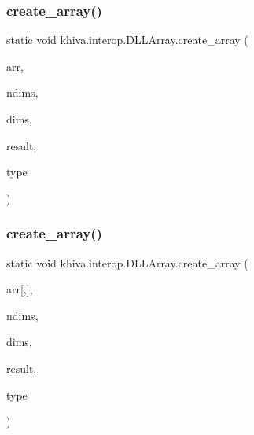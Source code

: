 \mbox{\label{classkhiva_1_1interop_1_1_d_l_l_array_ac6e0b2907774bf20bae24c7b6306786c}} 
\subsubsection{\texorpdfstring{create\+\_\+array()}{create\_array()}\hspace{0.1cm}{\footnotesize\ttfamily [5/36]}}
{\footnotesize\ttfamily static void khiva.\+interop.\+D\+L\+L\+Array.\+create\+\_\+array (\begin{DoxyParamCaption}\item[{\mbox{[}\+In\mbox{]} double \mbox{[}$\,$\mbox{]}}]{arr,  }\item[{\mbox{[}\+In\mbox{]} ref uint}]{ndims,  }\item[{\mbox{[}\+In\mbox{]} long \mbox{[}$\,$\mbox{]}}]{dims,  }\item[{\mbox{[}\+Out\mbox{]} out Int\+Ptr}]{result,  }\item[{\mbox{[}\+In\mbox{]} ref int}]{type }\end{DoxyParamCaption})\hspace{0.3cm}{\ttfamily [static]}}

\mbox{\label{classkhiva_1_1interop_1_1_d_l_l_array_a757e5578815a9d722a51b49f192ba142}} 
\subsubsection{\texorpdfstring{create\+\_\+array()}{create\_array()}\hspace{0.1cm}{\footnotesize\ttfamily [6/36]}}
{\footnotesize\ttfamily static void khiva.\+interop.\+D\+L\+L\+Array.\+create\+\_\+array (\begin{DoxyParamCaption}\item[{\mbox{[}\+In\mbox{]} double}]{arr\mbox{[},\mbox{]},  }\item[{\mbox{[}\+In\mbox{]} ref uint}]{ndims,  }\item[{\mbox{[}\+In\mbox{]} long \mbox{[}$\,$\mbox{]}}]{dims,  }\item[{\mbox{[}\+Out\mbox{]} out Int\+Ptr}]{result,  }\item[{\mbox{[}\+In\mbox{]} ref int}]{type }\end{DoxyParamCaption})\hspace{0.3cm}{\ttfamily [static]}}

